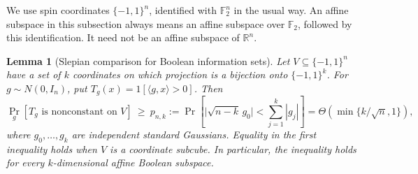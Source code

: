 \documentclass[11pt,letterpaper]{article}
\newtheorem{lemma}[theorem]{Lemma}
\theoremstyle{definition}
\theoremstyle{remark}
\begin{document}
We use spin coordinates $\{-1,1\}^n$, identified with $\mathbb F_2^n$ in the
usual way.  An affine subspace in this subsection always means an affine
subspace over $\mathbb F_2$, followed by this identification.  It need not be
an affine subspace of $\mathbb R^n$.

\begin{lemma}[Slepian comparison for Boolean information sets]
\label{lim:slepian}
Let $V\subseteq\{-1,1\}^n$ have a set of $k$ coordinates on which projection
is a bijection onto $\{-1,1\}^k$.  For $g\sim N(0,I_n)$, put
$T_g(x)=1[\langle g,x\rangle>0]$.  Then
\begin{equation}
 \Pr_g[T_g\text{ is nonconstant on }V]
\ \ge\ p_{n,k}:=\Pr\left[
       \big|\sqrt{n-k}\,g_0\big|<\sum_{j=1}^k|g_j|\right]
 =\Theta\left(\min\{k/\sqrt n,1\}\right),
 \label{lim:survival}
\end{equation}
where $g_0,\ldots,g_k$ are independent standard Gaussians.  Equality in the
first inequality holds when $V$ is a coordinate subcube.  In particular, the
inequality holds for every $k$-dimensional affine Boolean subspace.
\end{lemma}
\end{document}
